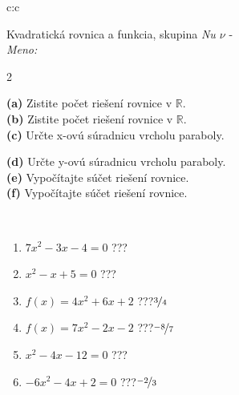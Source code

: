 \documentclass[10pt]{report}
\begin{document}
\begin{tabular}{c:c}
\begin{minipage}[c][104.5mm][t]{0.5\linewidth}
\begin{center}
\vspace{7mm}
{\huge {\LARGE Kvadratická rovnica a funkcia}, skupina \textit{Nu $\nu$} -}\\[5mm]
\textit{Meno:}\phantom{xxxxxxxxxxxxxxxxxxxxxxxxxxxxxxxxxxxxxxxxxxxxxxxxxxxxxxxxxxxxxxxxx}\\[5mm]
\begin{minipage}{0.95\linewidth}
\begin{center}
{\small \begin{multicols}{2} \raggedright
\textbf{(a)} Zistite počet riešení rovnice v \(\mathbb{R}\). \\[1mm]
\textbf{(b)} Zistite počet riešení rovnice v \(\mathbb{R}\). \\[1mm]
\textbf{(c)} Určte x-ovú súradnicu vrcholu paraboly. \par \columnbreak
\textbf{(d)} Určte y-ovú súradnicu vrcholu paraboly. \\[1mm]
\textbf{(e)} Vypočítajte súčet riešení rovnice. \\[1mm]
\textbf{(f)} Vypočítajte súčet riešení rovnice.
\end{multicols}
}
\end{center}
\end{minipage}
\\[4mm]
\begin{minipage}{0.79\linewidth}
\begin{center}
\begin{varwidth}{\linewidth}
\begin{enumerate}
\Large
\item $7x^2-3x-4=0$\quad \dotfill\; ???\;\dotfill {}
\item $x^2-x+5=0$\quad \dotfill\; ???\;\dotfill {}
\item $f(x)=4x^2+6x+2$\quad \dotfill\; ???\;\dotfill \quad $\nicefrac{3}{4}$
\item $f(x)=7x^2-2x-2$\quad \dotfill\; ???\;\dotfill \quad $\nicefrac{-8}{7}$
\item $x^2-4x-12=0$\quad \dotfill\; ???\;\dotfill {}
\item $-6x^2-4x+2=0$\quad \dotfill\; ???\;\dotfill \quad $\nicefrac{-2}{3}$
\end{enumerate}
\end{varwidth}
\end{center}
\end{minipage}

\end{center}
\end{minipage}
\end{tabular}
\end{document}
